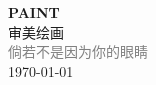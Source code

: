 \vspace*{\fill}
\begin{center}
    \textcolor{brown!50}{\Huge\textbf{PAINT}} \\[1em]
    \textcolor{brown!60!pink}{\Large 审美绘画} \\[2em]
    \textcolor{gray}{\large 倘若不是因为你的眼睛} \\[1em]
    \today
\end{center}
\vspace*{\fill}
\clearpage


\clearpage

\clearpage
